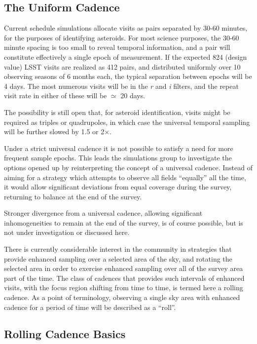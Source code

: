 \subsection{The Uniform Cadence}

Current schedule simulations allocate visits as pairs separated by 30-60
minutes, for the purposes of identifying asteroids.  For most science
purposes, the 30-60 minute spacing is too small to reveal temporal
information, and a pair will constitute effectively a single epoch of
measurement.  If the expected 824 (design value) LSST visits are
realized as 412 pairs, and distributed uniformly over 10 observing
seasons of 6 months each, the typical separation between epochs will be
4 days.   The most numerous visits will be in the {\it r} and {\it i}
filters, and the repeat visit rate in either of these will be $\simeq$
20 days.

The possibility is still open that, for asteroid identification, visits
might be required as triples or quadrupoles, in which case the universal
temporal sampling will be further slowed by 1.5 or 2$\times$.

Under a strict universal cadence it is not possible to satisfy a need
for more frequent sample epochs.  This leads the simulations group to
investigate the options opened up by reinterpreting the concept of a
universal cadence.  Instead of aiming for a strategy which attempts to
observe all fields ``equally'' all the time, it would allow significant
deviations from equal coverage during the survey, returning to balance
at the end of the survey.

Stronger divergence from a universal cadence, allowing significant
inhomogeneities to remain at the end of the survey, is of course
possible, but is not under investigation or discussed here.

There is currently considerable interest in the community in strategies
that provide enhanced sampling over a selected area of the sky, and
rotating the selected area in order to exercise enhanced sampling over
all of the survey area part of the time.  The class of cadences that
provides such intervals of enhanced visits, with the focus region
shifting from time to time, is termed here a rolling cadence.  As a
point of terminology, observing a single sky area with enhanced cadence
for a period of time will be described as a ``roll''.

\subsection{Rolling Cadence Basics}

